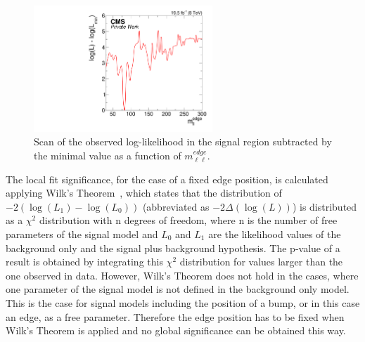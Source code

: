 \begin{figure}[htbp]
\centering
  \includegraphics[width=0.6\textwidth]{plots/results/fit/signal.pdf}
\caption{Scan of the observed log-likelihood in the signal region subtracted by the minimal value as a function of $m_{\ell\ell}^{edge}$.}
\label{fig:fit:likelihoodScan}
\end{figure}

The local fit significance, for the case of a fixed edge position, is calculated applying Wilk's Theorem~\cite{wilks1938}, which states that the distribution of $-2\left(\log\left(L_1\right)-\log\left(L_0\right)\right)$ (abbreviated as $-2\Delta\left(\log\left(L\right)\right)$) is distributed as a $\chi^2$ distribution with n degrees of freedom, where n is the number of free parameters of the signal model and $L_0$ and $L_1$ are the likelihood values of the background only and the signal plus background hypothesis. The p-value of a result is obtained by integrating this $\chi^2$ distribution for values larger than the one observed in data. However, Wilk's Theorem does not hold in the cases, where one parameter of the signal model is not defined in the background only model. This is the case for signal models including the position of a bump, or in this case an edge, as a free parameter. Therefore the edge position has to be fixed when Wilk's Theorem is applied and no global significance can be obtained this way. 

